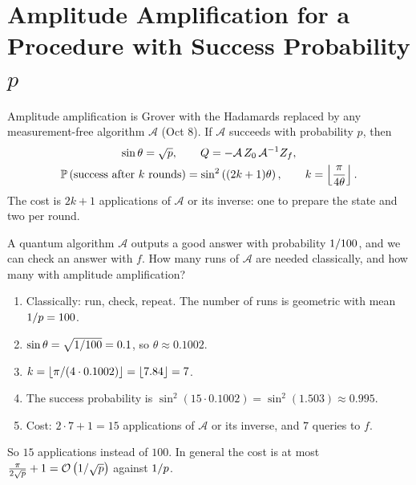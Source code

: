 \section{Amplitude Amplification for a Procedure with Success Probability $p$}\label{sec:ampamp}

Amplitude amplification is Grover with the Hadamards replaced by any measurement-free algorithm
$\mathcal{A}$ (Oct 8). If $\mathcal{A}$ succeeds with probability $p$, then
\begin{gather*}
    \sin\theta = \sqrt{p},
    \qquad
    Q = -\mathcal{A}\, Z_0\, \mathcal{A}^{-1} Z_f, \\
    \prob{\text{success after } k \text{ rounds}} = \sin^2\left((2k+1)\theta\right),
    \qquad
    k = \floor{\frac{\pi}{4\theta}}.
\end{gather*}
The cost is $2k + 1$ applications of $\mathcal{A}$ or its inverse: one to prepare the state and two
per round.

\begin{exercisebox}
\begin{pproblem}[$p = 1/100$]\label{pp:amp100}
    A quantum algorithm $\mathcal{A}$ outputs a good answer with probability $1/100$, and we
    can check an answer with $f$. How many runs of $\mathcal{A}$ are needed classically, and how
    many with amplitude amplification?
\end{pproblem}
\tcblower
\begin{wsolution}
    \leavevmode
    \begin{enumerate}
        \item Classically: run, check, repeat. The number of runs is geometric with mean
              $1/p = 100$.
        \item $\sin\theta = \sqrt{1/100} = 0.1$, so $\theta \approx 0.1002$.
        \item $k = \floor{\sfrac{\pi}{(4 \cdot 0.1002)}} = \floor{7.84} = 7$.
        \item The success probability is $\sin^2(15 \cdot 0.1002) = \sin^2(1.503) \approx 0.995$.
        \item Cost: $2 \cdot 7 + 1 = 15$ applications of $\mathcal{A}$ or its inverse, and $7$
              queries to $f$.
    \end{enumerate}
    So $15$ applications instead of $100$. In general the cost is at most
    $\frac{\pi}{2\sqrt{p}} + 1 = \mathcal{O}\left(1/\sqrt{p}\right)$ against $1/p$.
\end{wsolution}
\end{exercisebox}

